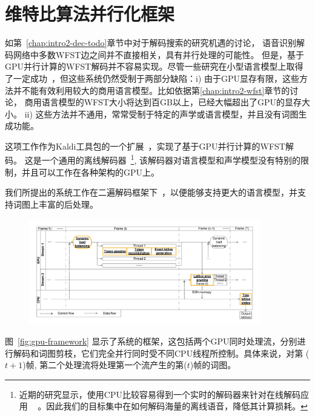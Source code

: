 \section{维特比算法并行化框架}
\label{chap:gpu-viterbi}


如第~\ref{chap:intro2-dec-todo}章节中对于解码搜索的研究机遇的讨论，
语音识别解码网络中多数WFST边之间并不直接相关，具有并行处理的可能性。
但是，基于GPU并行计算的WFST解码并不容易实现。尽管一些研究在小型语言模型上取得了一定成功~\cite{you2009parallel}，但这些系统仍然受制于两部分缺陷：i) 由于GPU显存有限，这些方法并不能有效利用较大的商用语言模型。比如依据第\ref{chap:intro2-wfst}章节的讨论， 商用语言模型的WFST大小将达到百GB以上，已经大幅超出了GPU的显存大小。
ii) 这些方法并不通用，常常受制于特定的声学或语言模型，并且没有词图生成功能。


这项工作作为Kaldi工具包的一个扩展~\cite{povey2011kaldi}，实现了基于GPU并行计算的WFST解码。
%
这是一个通用的离线解码器~\footnote{近期的研究显示，使用CPU比较容易得到一个实时的解码器来针对在线解码应用
 ~\cite{peddinti2018low,zhc00-chen-tasl2017} 。因此我们的目标集中在如何解码海量的离线语音，降低其计算损耗。},
 该解码器对语言模型和声学模型没有特别的限制，并且可以工作在各种架构的GPU上。
%

我们所提出的系统工作在二遍解码框架下~\cite{woodland19951994}，以便能够支持更大的语言模型，并支持词图上丰富的后处理。

\begin{figure}[htb]
  \centering
    \captionstyle{\centering}
    \includegraphics[width=0.9\textwidth]{figure/gpu_framework.pdf}
\end{figure}

图~\ref{fig:gpu-framework} 显示了系统的框架，这包括两个GPU同时处理流，分别进行解码和词图剪枝，它们完全并行同时受不同CPU线程所控制。具体来说，对第 ($t+1$)帧, 第二个处理流将处理第一个流产生的第($t$)帧的词图。


